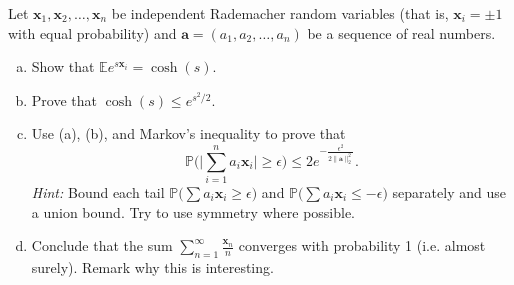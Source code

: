 \documentclass[12pt,letterpaper,cm]{hmcpset}
\newcommand\x{\boldsymbol{x}}
\renewcommand\a{\boldsymbol{a}}
\newcommand\E{\mathbb{E}}
\renewcommand\P{\mathbb{P}}
\begin{document}
\begin{problem}
    Let $\x_1,\x_2,\ldots,\x_n$ be independent Rademacher random variables
    (that is, $\x_i = \pm 1$ with equal probability) and $\a=(a_1,a_2,\ldots,a_n)$
    be a sequence of real numbers.
\begin{enumerate}[(a)]
    \item Show that $\E e^{s \x_i} = \cosh(s)$.
    \item Prove that $\cosh(s) \leq e^{s^2/2}$.
    \item Use (a), (b), and Markov's inequality to prove that $$\P\biggl(\biggl|\sum_{i=1}^n a_i \x_i\biggr| \geq \epsilon\biggr) \leq 2e^{-\tfrac{\epsilon^2}{2\|\a\|_2^2}}.$$ \textit{Hint:} Bound each tail $\P\bigl(\sum a_i \x_i \geq \epsilon\bigr)$ and $\P\bigl(\sum a_i \x_i \leq -\epsilon\bigr)$ separately and use a union bound. Try to use symmetry where possible.
    \item Conclude that the sum $\sum_{n=1}^\infty \frac{\x_n}{n}$ converges with probability 1 (i.e. almost surely). Remark why this is interesting.
\end{enumerate}
\end{problem}

\begin{solution}
    \vfill
\end{solution}
\end{document}
